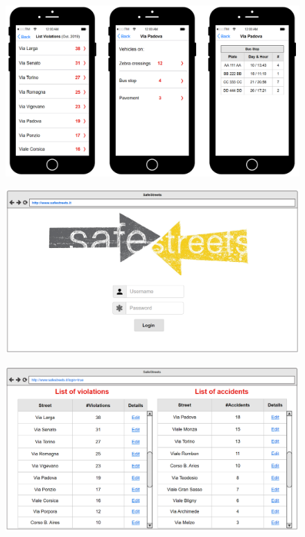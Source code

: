 \begin{figure}
[H]
\includegraphics[scale=0.48]{Images/Templates/Authority/auth_2.PNG}
\end{figure}

\begin{figure}
[H]
\includegraphics[scale=0.5]{Images/Templates/Authority/auth_3.PNG}
\end{figure}

\begin{figure}
[H]
\includegraphics[scale=0.5255]{Images/Templates/Authority/auth_4.PNG}
\end{figure}
\newpage

